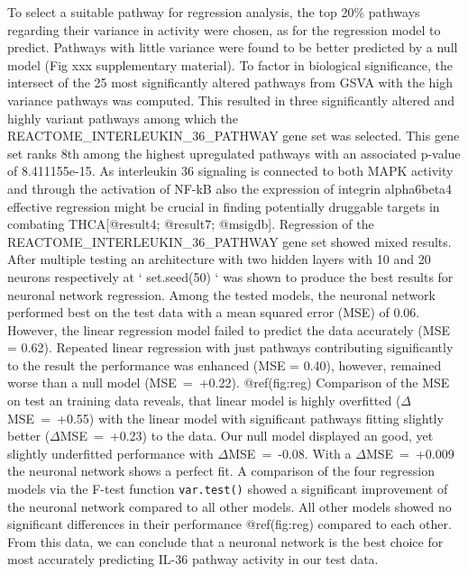 \documentclass[
]{article}
\begin{document}
To select a suitable pathway for regression analysis, the top 20\%
pathways regarding their variance in activity were chosen, as for the
regression model to predict. Pathways with little variance were found to
be better predicted by a null model (Fig xxx supplementary material). To
factor in biological significance, the intersect of the 25 most
significantly altered pathways from GSVA with the high variance pathways
was computed. This resulted in three significantly altered and highly
variant pathways among which the REACTOME\_INTERLEUKIN\_36\_PATHWAY gene
set was selected. This gene set ranks 8th among the highest upregulated
pathways with an associated p-value of 8.411155e-15. As interleukin 36
signaling is connected to both MAPK activity and through the activation
of NF-kB also the expression of integrin alpha6beta4 effective
regression might be crucial in finding potentially druggable targets in
combating THCA{[}@result4; @result7; @msigdb{]}. Regression of the
REACTOME\_INTERLEUKIN\_36\_PATHWAY gene set showed mixed results. After
multiple testing an architecture with two hidden layers with 10 and 20
neurons respectively at ` set.seed(50) ` was shown to produce the best
results for neuronal network regression. Among the tested models, the
neuronal network performed best on the test data with a mean squared
error (MSE) of 0.06. However, the linear regression model failed to
predict the data accurately (MSE = 0.62). Repeated linear regression
with just pathways contributing significantly to the result the
performance was enhanced (MSE = 0.40), however, remained worse than a
null model (MSE~=~+0.22). @ref(fig:reg) Comparison of the MSE on test an
training data reveals, that linear model is highly overfitted
(\(\Delta\)MSE~=~+0.55) with the linear model with significant pathways
fitting slightly better (\(\Delta\)MSE~=~+0.23) to the data. Our null
model displayed an good, yet slightly underfitted performance with
\(\Delta\)MSE~=~-0.08. With a \(\Delta\)MSE~=~+0.009 the neuronal
network shows a perfect fit. A comparison of the four regression models
via the F-test function \texttt{var.test()} showed a significant
improvement of the neuronal network compared to all other models. All
other models showed no significant differences in their performance
@ref(fig:reg) compared to each other. From this data, we can conclude
that a neuronal network is the best choice for most accurately
predicting IL-36 pathway activity in our test data.
\end{document}
